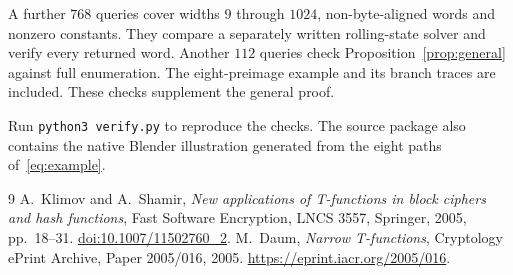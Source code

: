 \documentclass[11pt,a4paper]{article}
\begin{document}
A further $768$ queries cover widths $9$ through $1024$, non-byte-aligned words and nonzero constants. They compare a separately written rolling-state solver and verify every returned word. Another $112$ queries check Proposition~\ref{prop:general} against full enumeration. The eight-preimage example and its branch traces are included. These checks supplement the general proof.

Run \texttt{python3 verify.py} to reproduce the checks. The source package also contains the native Blender illustration generated from the eight paths of~\eqref{eq:example}.

\begin{thebibliography}{9}
A.~Klimov and A.~Shamir,
\emph{New applications of T-functions in block ciphers and hash functions},
Fast Software Encryption, LNCS 3557, Springer, 2005, pp.~18--31.
\href{https://doi.org/10.1007/11502760_2}{doi:10.1007/11502760\_2}.
M.~Daum,
\emph{Narrow T-functions},
Cryptology ePrint Archive, Paper 2005/016, 2005.
\url{https://eprint.iacr.org/2005/016}.
\end{thebibliography}
\end{document}
